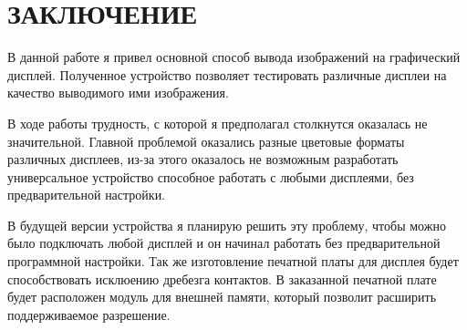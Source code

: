 \chapter*{ЗАКЛЮЧЕНИЕ}

	В данной работе я привел основной способ вывода изображений на графический дисплей. Полученное устройство позволяет тестировать различные дисплеи на качество выводимого ими изображения.
	
	В ходе работы трудность, с которой я предполагал столкнутся оказалась не значительной. Главной проблемой оказались разные цветовые форматы различных дисплеев, из-за этого оказалось не возможным разработать универсальное устройство способное работать с любыми дисплеями, без предварительной настройки. 
	
	В будущей версии устройства я планирую решить эту проблему, чтобы можно было подключать любой дисплей и он начинал работать без предварительной программной настройки. Так же изготовление печатной платы для дисплея будет способствовать исклюению дребезга контактов. В заказанной печатной плате будет расположен модуль для внешней памяти, который позволит расширить поддерживаемое разрешение.

	
	

	
